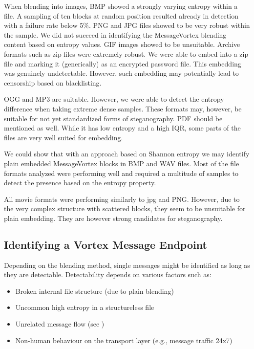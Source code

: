 When blending into images, BMP showed a strongly varying entropy within a file. A sampling of ten blocks at random position resulted already in detection with a failure rate below 5\%. PNG and JPG files showed to be very robust within the sample. We did not succeed in identifying the MessageVortex blending content based on entropy values. GIF images showed to be unsuitable. Archive formats such as zip files were extremely robust. We were able to embed into a zip file and marking it (generically) as an encrypted password file. This embedding was genuinely undetectable. However, such embedding may potentially lead to censorship based on blacklisting.

OGG and MP3 are suitable. However, we were able to detect the entropy difference when taking extreme dense samples. These formats may, however, be suitable for not yet standardized forms of steganography. PDF should be mentioned as well. While it has low entropy and a high IQR, some parts of the files are very well suited for embedding.

We could show that with an approach based on Shannon entropy we may identify plain embedded MessageVortex blocks in BMP and WAV files. Most of the file formats analyzed were performing well and required a multitude of samples to detect the presence based on the entropy property.

All movie formats were performing similarly to jpg and PNG. However, due to the very complex structure with scattered blocks, they seem to be unsuitable for plain embedding. They are however strong candidates for steganography.

\subsection{Identifying a Vortex Message Endpoint}
Depending on the blending method, single messages might be identified as long as they are detectable. Detectability depends on various factors such as:

\begin{itemize}
	\item Broken internal file structure (due to plain blending)
	\item Uncommon high entropy in a structureless file
	\item Unrelated message flow (see \cite{oakland2013-parrot})
	\item Non-human behaviour on the transport layer (e.g., message traffic 24x7)
\end{itemize}

